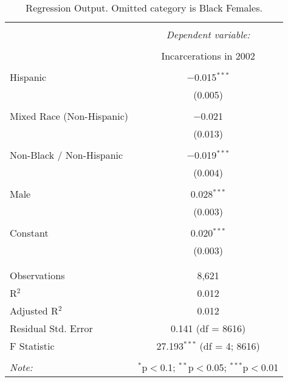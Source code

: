 
\begin{table}[!htbp] \centering 
  \caption{Regression Output. Omitted category is Black Females.} 
  \label{tab:regression} 
\begin{tabular}{@{\extracolsep{5pt}}lc} 
\\[-1.8ex]\hline 
\hline \\[-1.8ex] 
 & \multicolumn{1}{c}{\textit{Dependent variable:}} \\ 
\cline{2-2} 
\\[-1.8ex] & Incarcerations in 2002 \\ 
\hline \\[-1.8ex] 
 Hispanic & $-$0.015$^{***}$ \\ 
  & (0.005) \\ 
  & \\ 
 Mixed Race (Non-Hispanic) & $-$0.021 \\ 
  & (0.013) \\ 
  & \\ 
 Non-Black / Non-Hispanic & $-$0.019$^{***}$ \\ 
  & (0.004) \\ 
  & \\ 
 Male & 0.028$^{***}$ \\ 
  & (0.003) \\ 
  & \\ 
 Constant & 0.020$^{***}$ \\ 
  & (0.003) \\ 
  & \\ 
\hline \\[-1.8ex] 
Observations & 8,621 \\ 
R$^{2}$ & 0.012 \\ 
Adjusted R$^{2}$ & 0.012 \\ 
Residual Std. Error & 0.141 (df = 8616) \\ 
F Statistic & 27.193$^{***}$ (df = 4; 8616) \\ 
\hline 
\hline \\[-1.8ex] 
\textit{Note:}  & \multicolumn{1}{r}{$^{*}$p$<$0.1; $^{**}$p$<$0.05; $^{***}$p$<$0.01} \\ 
\end{tabular} 
\end{table} 
